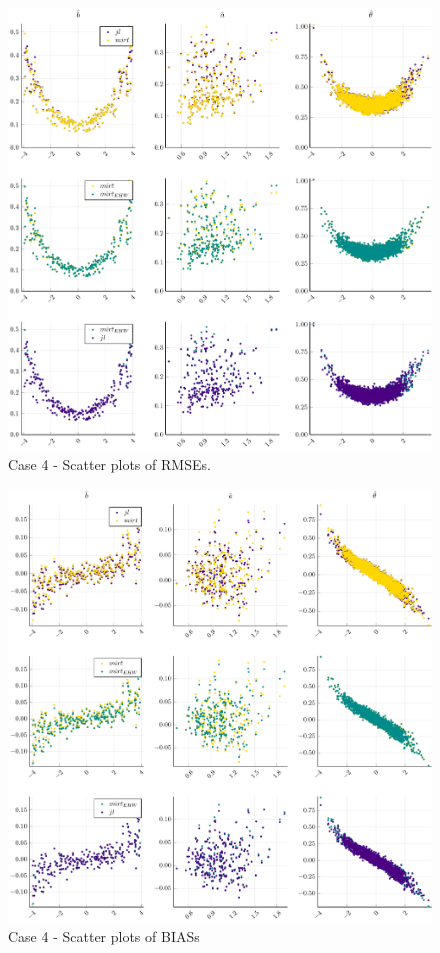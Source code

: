 \begin{figure}[ht]
	\centering
	\includegraphics[width=\textwidth]{Figures/4/RMSEscatter.pdf}
	\caption{Case 4 - Scatter plots of RMSEs.}
	\label{fig:spRMSE4}
\end{figure}
\begin{figure}[ht]
	\centering
	\includegraphics[width=\textwidth]{Figures/4/BIASscatter.pdf}
	\caption{Case 4 - Scatter plots of BIASs }
	\label{fig:spBIAS4}
\end{figure}

